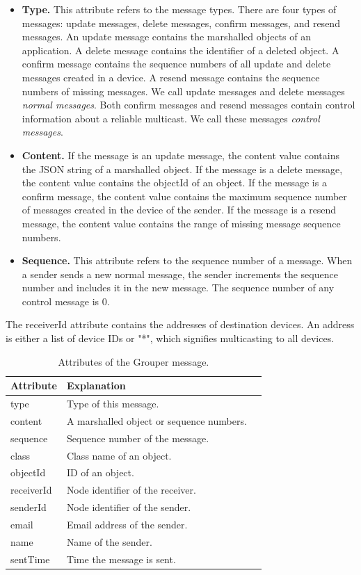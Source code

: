 \documentclass{sig-alternate-05-2015}
\begin{document}
\begin{itemize}[leftmargin=7mm]
	\setlength{\itemsep}{1pt}
	\setlength{\parskip}{0pt}
	\setlength{\parsep}{0pt}
	\item \textbf{Type.}
	This attribute refers to the message types.
	There are four types of messages: update messages, delete messages, confirm messages, and resend messages.
	An update message contains the marshalled objects of an application.
	A delete message contains the identifier of a deleted object.
	A confirm message contains the sequence numbers of all update and delete messages created in a device.
	A resend message contains the sequence numbers of missing messages.
	We call update messages and delete messages \emph{normal messages}. 
	Both confirm messages and resend messages contain control information about a reliable multicast. 
	We call these messages \emph{control messages}.
	\item \textbf{Content.} 
	If the message is an update message, the content value contains the JSON string of a marshalled object.
	If the message is a delete message, the content value contains the objectId of an object.
	If the message is a confirm message, the content value contains the maximum sequence number of messages created in the device of the sender.
	If the message is a resend message, the content value contains the range of missing message sequence numbers.
	\item \textbf{Sequence.}
	This attribute refers to the sequence number of a message.
	When a sender sends a new normal message, the sender increments the sequence number and includes it in the new message.
	The sequence number of any control message is 0.
\end{itemize}

The receiverId attribute contains the addresses of destination devices.
An address is either a list of device IDs or "*", which signifies multicasting to all devices.

\begin{table}[t]
	\centering
	\caption{Attributes of the Grouper message.}
	\begin{tabular}{lll}
		\hline
		\textbf{Attribute} & \textbf{Explanation} \\ \hline
		type & Type of this message. \\
		content & A marshalled object or sequence numbers. \\
		sequence & Sequence number of the message. \\
		class & Class name of an object. \\
		objectId & ID of an object. \\
		receiverId & Node identifier of the receiver. \\
		senderId & Node identifier of the sender. \\
		email & Email address of the sender. \\
		name & Name of the sender. \\
		sentTime & Time the message is sent. \\
		\hline
	\end{tabular}
\end{table}
\end{document}
